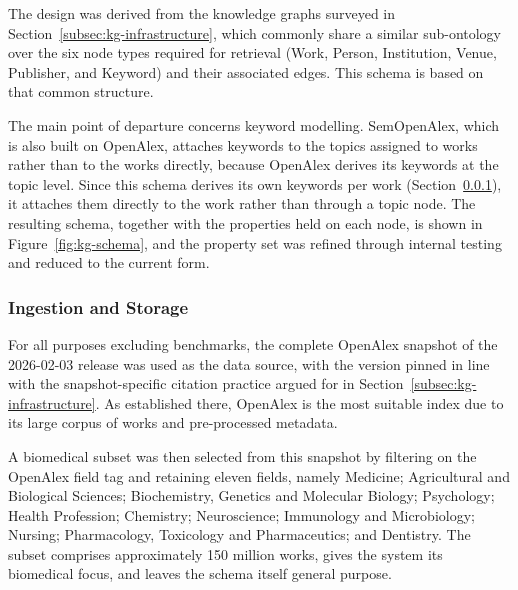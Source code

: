 The design was derived from the knowledge graphs surveyed in Section~\ref{subsec:kg-infrastructure}, which commonly share a similar sub-ontology over the six node types required for retrieval (Work, Person, Institution, Venue, Publisher, and Keyword) and their associated edges. This schema is based on that common structure.

The main point of departure concerns keyword modelling. SemOpenAlex, which is also built on OpenAlex, attaches keywords to the topics assigned to works rather than to the works directly, because OpenAlex derives its keywords at the topic level. Since this schema derives its own keywords per work (Section~\ref{subsubsec:ingestion-storage}), it attaches them directly to the work rather than through a topic node. The resulting schema, together with the properties held on each node, is shown in Figure~\ref{fig:kg-schema}, and the property set was refined through internal testing and reduced to the current form.

\subsubsection{Ingestion and Storage}
\label{subsubsec:ingestion-storage}

For all purposes excluding benchmarks, the complete OpenAlex snapshot of the 2026-02-03 release was used as the data source, with the version pinned in line with the snapshot-specific citation practice argued for in Section~\ref{subsec:kg-infrastructure}. As established there, OpenAlex is the most suitable index due to its large corpus of works and pre-processed metadata.

A biomedical subset was then selected from this snapshot by filtering on the OpenAlex field tag and retaining eleven fields, namely Medicine; Agricultural and Biological Sciences; Biochemistry, Genetics and Molecular Biology; Psychology; Health Profession; Chemistry; Neuroscience; Immunology and Microbiology; Nursing; Pharmacology, Toxicology and Pharmaceutics; and Dentistry. The subset comprises approximately 150 million works, gives the system its biomedical focus, and leaves the schema itself general purpose.

